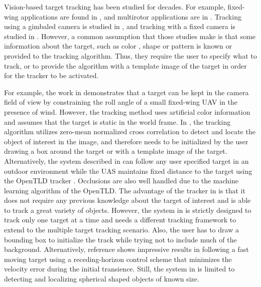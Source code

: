 Vision-based target tracking has been studied for decades. For example, fixed-wing applications are found in \cite{Saunders2011, Rysdyk2006, Dobrokhodov2006, Qadir2011, Theodorakopoulos2008}, and multirotor applications are in \cite{Pestana2013, Thomas2017, Teuliere2011, Kim2013}. Tracking using a gimbaled camera is studied in \cite{Rysdyk2006, Dobrokhodov2006, Hurak2012}, and tracking with a fixed camera is studied in \cite{Saunders2011, Theodorakopoulos2008, Pestana2013, Thomas2017, Teuliere2011, Kim2013}. However, a common assumption that those studies make is that some information about the target, such as color \cite{Teuliere2011, Kim2013}, shape \cite{Thomas2017} or pattern \cite{Lee2012} is known or provided to the tracking algorithm. Thus, they require the user to specify what to track, or to provide the algorithm with a template image of the target in order for the tracker to be activated. 

For example, the work in \cite{Saunders2011} demonstrates that a target can be kept in the camera field of view by constraining the roll angle of a small fixed-wing UAV in the presence of wind. However, the tracking method uses artificial color information and assumes that the target is static in the world frame. In \cite{Qadir2011}, the tracking algorithm utilizes zero-mean normalized cross correlation to detect and locate the object of interest in the image, and therefore needs to be initialized by the user drawing a box around the target or with a template image of the target. Alternatively, the system described in \cite{Pestana2013} can follow any user specified target in an outdoor environment while the UAS maintains fixed distance to the target using the OpenTLD tracker \cite{Kalal2012}. Occlusions are also well handled due to the machine learning algorithm of the OpenTLD. The advantage of the tracker in \cite{Kalal2012} is that it does not require any previous knowledge about the target of interest and is able to track a great variety of objects. However, the system in \cite{Pestana2013} is strictly designed to track only one target at a time and needs a different tracking framework to extend to the multiple target tracking scenario. Also, the user has to draw a bounding box to initialize the track while trying not to include much of the background. Alternatively, reference \cite{Thomas2017} shows impressive results in following a fast moving target using a receding-horizon control scheme that minimizes the velocity error during the initial transience. Still, the system in \cite{Thomas2017} is limited to detecting and localizing spherical shaped objects of known size. 


